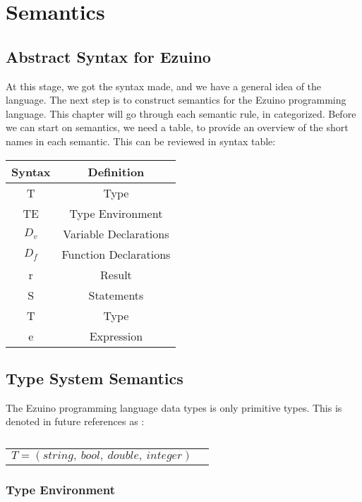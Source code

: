 \chapter{Semantics}
\label{semantics}
\section{Abstract Syntax for Ezuino}
At this stage, we got the syntax made, and we have a general idea of the language. The next step is to construct semantics for the Ezuino programming language. This chapter will go through each semantic rule, in categorized. 
Before we can start on semantics, we need a table, to provide an overview of the short names in each semantic. This can be  reviewed in syntax table: 
\begin{table}[H]
\centering
\begin{tabular}{|c|c|}
\hline
\textbf{Syntax} & \textbf{Definition}   \\ \hline
T               & Type                  \\ \hline
TE              & Type Environment      \\ \hline
$D_v$           & Variable Declarations \\ \hline
$D_f$           & Function Declarations \\ \hline
r               & Result                \\ \hline
S               & Statements            \\ \hline
T               & Type                  \\ \hline
e               & Expression            \\ \hline
\end{tabular}
\end{table}

\section{Type System Semantics}
The Ezuino programming language data types is only primitive types. This is denoted in future references as :
\begin{table}[H]
    \centering
    \begin{longtable}[c] { r c }
      
        \( { T = (string,\ bool,\ double,\ integer)} \) \\
    \end{longtable}
    \caption{}\label{type:primitives}
\end{table}

\subsection{Type Environment}
